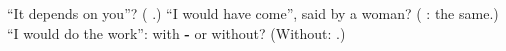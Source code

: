 \begin{tcolorbox}[breakable,colback=teal!4,colframe=teal!35!black,title={Before you move on}]
\textquotedblleft{}It depends on you\textquotedblright{}? (\textbf{     }.) \textquotedblleft{}I would have come\textquotedblright{}, said by a woman? (\textbf{ }: the same.) \textquotedblleft{}I would do the work\textquotedblright{}: with \textbf{-} or without? (Without: \textbf{  }.)
\end{tcolorbox}
